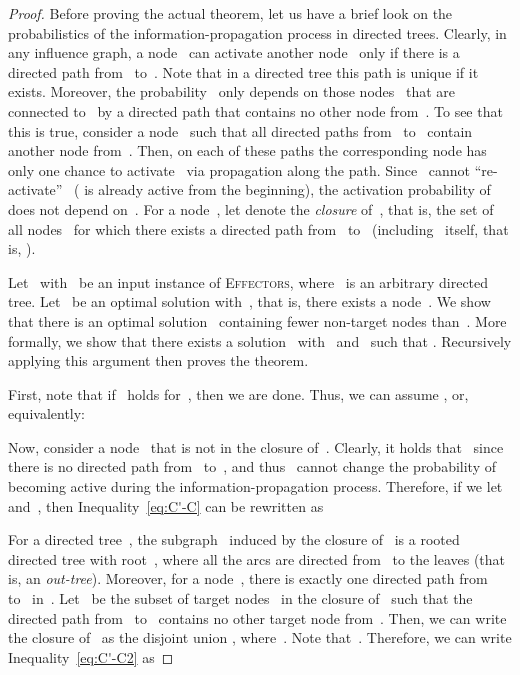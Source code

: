\documentclass{article}
\newcommand{\probEffectors}{\textsc{Effectors}\xspace}
\begin{document}
\begin{proof}
  Before proving the actual theorem, let us have a brief look on the
  probabilistics of the information-propagation process in directed
  trees.
  Clearly, in any influence graph, a node~ can activate another
  node~ only if there is a directed path from~ to~.
  Note that in a directed tree this path is unique if it exists.
  Moreover, the probability~ only depends on
  those nodes~ that are connected to~ by a directed path that
  contains no other node from~.
  To see that this is true, consider a node~ such that all directed paths from~ to~ contain another node from~. Then, on each of these paths the corresponding node  has only one chance to activate~ via propagation along the path. Since~ cannot ``re-activate''~ ( is already active from the beginning), the activation probability of~ does not depend on~. 
  For a node~, let  denote the \emph{closure} of~,
  that is, the set of all nodes~ for which there exists a directed
  path from~ to~ (including~ itself, that is, ).

  Let~ with~ be an input instance of
  \probEffectors, where~ is an arbitrary directed tree.
  Let~ be an optimal solution with~,
  that is, there exists a node~.
  We show that there is an optimal solution~ containing
  fewer non-target nodes than~.
  More formally, we show that there exists a solution~
  with~ and~ such that
  . Recursively applying this argument
  then proves the theorem.

  First, note that if~ holds for~,
  then we are done. Thus, we can assume , or, equivalently:
  
  Now, consider a node~ that is not in the closure
  of~. Clearly, it holds that~ since there is no directed path
  from~ to~, and thus~ cannot change the 
  probability of~ becoming active during the information-propagation process.
  Therefore, if we let~ and~,
  then Inequality~\eqref{eq:C'-C} can be rewritten as
  
  For a directed tree~, the subgraph~ induced by the
  closure of~ is a rooted directed tree with root~,
  where all the arcs are directed from~ to the leaves (that is, an
  \emph{out-tree}).
  Moreover, for a node~, there is exactly one directed path
  from~ to~ in~. Let~ be the subset of target
  nodes~ in the closure of~ such that the directed path from~ to~
  contains no other target node from~.
  Then, we can write the closure of~ as the disjoint union
  ,
  where~.
  Note that~.
  Therefore, we can write Inequality~\eqref{eq:C'-C2} as
  

\end{proof}
\end{document}
